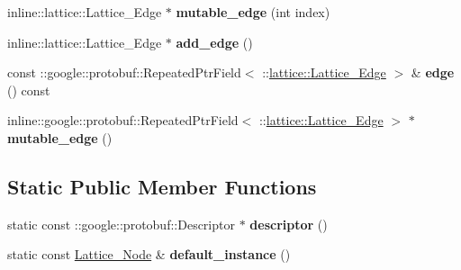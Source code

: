 \begin{DoxyCompactItemize}
\item 
\hypertarget{classlattice_1_1Lattice__Node_acf217e32657e81c9923cbb99e12ce3ac}{
inline::lattice::Lattice\_\-Edge $\ast$ {\bfseries mutable\_\-edge} (int index)}
\label{classlattice_1_1Lattice__Node_acf217e32657e81c9923cbb99e12ce3ac}

\item 
\hypertarget{classlattice_1_1Lattice__Node_ac1458c47ea3591c2039a072a1168f76d}{
inline::lattice::Lattice\_\-Edge $\ast$ {\bfseries add\_\-edge} ()}
\label{classlattice_1_1Lattice__Node_ac1458c47ea3591c2039a072a1168f76d}

\item 
\hypertarget{classlattice_1_1Lattice__Node_a1a529655a726b6444615985888c4fad7}{
const ::google::protobuf::RepeatedPtrField$<$ ::\hyperlink{classlattice_1_1Lattice__Edge}{lattice::Lattice\_\-Edge} $>$ \& {\bfseries edge} () const }
\label{classlattice_1_1Lattice__Node_a1a529655a726b6444615985888c4fad7}

\item 
\hypertarget{classlattice_1_1Lattice__Node_afc586b8c22db1d283c6757d17d04fa8f}{
inline::google::protobuf::RepeatedPtrField$<$ ::\hyperlink{classlattice_1_1Lattice__Edge}{lattice::Lattice\_\-Edge} $>$ $\ast$ {\bfseries mutable\_\-edge} ()}
\label{classlattice_1_1Lattice__Node_afc586b8c22db1d283c6757d17d04fa8f}

\end{DoxyCompactItemize}
\subsection*{Static Public Member Functions}
\begin{DoxyCompactItemize}
\item 
\hypertarget{classlattice_1_1Lattice__Node_af5da3e85a5d01d0c7a285342e954f5f7}{
static const ::google::protobuf::Descriptor $\ast$ {\bfseries descriptor} ()}
\label{classlattice_1_1Lattice__Node_af5da3e85a5d01d0c7a285342e954f5f7}

\item 
\hypertarget{classlattice_1_1Lattice__Node_afa42163f206dd384606b8f10dcb8c193}{
static const \hyperlink{classlattice_1_1Lattice__Node}{Lattice\_\-Node} \& {\bfseries default\_\-instance} ()}
\label{classlattice_1_1Lattice__Node_afa42163f206dd384606b8f10dcb8c193}

\end{DoxyCompactItemize}
